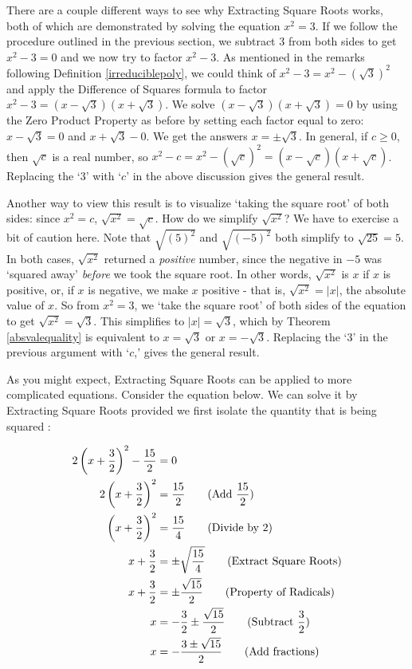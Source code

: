 There are a couple different ways to see why Extracting Square Roots works, both of which are demonstrated by solving the equation $x^2 = 3$.  If we follow the procedure outlined in the previous section, we subtract $3$ from both sides to get $x^2 - 3 = 0$ and we now try to factor $x^2 - 3$.   As mentioned in the remarks following Definition \ref{irreduciblepoly}, we could think of $x^2 - 3 = x^2 - (\sqrt{3})^2$ and apply the Difference of Squares formula to factor $x^2 - 3 = (x-\sqrt{3})(x+\sqrt{3})$.  We solve $(x-\sqrt{3})(x+\sqrt{3}) = 0$ by using the Zero Product Property as before by setting each factor equal to zero:  $x - \sqrt{3} = 0$ and $x+\sqrt{3} - 0$.  We get the answers $x = \pm \sqrt{3}$.  In general,  if $c \geq 0$, then $\sqrt{c}$ is a real number, so  $x^2 - c = x^2 - (\sqrt{c})^2 = (x-\sqrt{c})(x+\sqrt{c})$.  Replacing the `$3$' with `$c$' in the above discussion gives the general result. 

Another way to view this result is to visualize  `taking the square root' of both sides:   since $x^2 = c$,  $\sqrt{x^2} = \sqrt{c}$.  How do we simplify $\sqrt{x^2}$? We have to exercise a bit of caution here.  Note that $\sqrt{(5)^2}$ and $\sqrt{(-5)^2}$ both simplify to  $\sqrt{25} = 5$.  In both cases, $\sqrt{x^2}$ returned a \textit{positive} number, since the negative in $-5$ was `squared away' \textit{before} we took the square root.  In other words, $\sqrt{x^2}$ is $x$ if $x$ is positive, or, if $x$ is negative, we make $x$ positive - that is, $\sqrt{x^2} = |x|$, the absolute value of $x$.  So from $x^2 = 3$, we `take the square root' of both sides of the equation to get $\sqrt{x^2} = \sqrt{3}$.  This simplifies to $|x| = \sqrt{3}$, which by Theorem \ref{absvalequality} is equivalent to $x = \sqrt{3}$ or $x = -\sqrt{3}$.  Replacing the `$3$' in the previous argument with `$c$,' gives the general result.

As you might expect, Extracting Square Roots can be applied to more complicated equations.  Consider the equation below.  We can solve it by Extracting Square Roots provided we first isolate the quantity that is being squared :

\begin{align*}
2\left(x + \dfrac{3}{2}\right)^2 - \dfrac{15}{2} & = 0 \\
2\left(x + \dfrac{3}{2}\right)^2 & = \dfrac{15}{2} \tag{Add $\dfrac{15}{2}$} \\
\left(x + \dfrac{3}{2}\right)^2 & = \dfrac{15}{4} \tag{Divide by $2$} \\
x + \dfrac{3}{2} & = \pm \sqrt{\dfrac{15}{4}} \tag{Extract Square Roots} \\
x + \dfrac{3}{2} & = \pm \dfrac{\sqrt{15}}{2} \tag{Property of Radicals} \\
x & = -\dfrac{3}{2} \pm \dfrac{\sqrt{15}}{2}  \tag{Subtract $\dfrac{3}{2}$} \\
x & = -\dfrac{3 \pm \sqrt{15}}{2}  \tag{Add fractions} \\
\end{align*}


